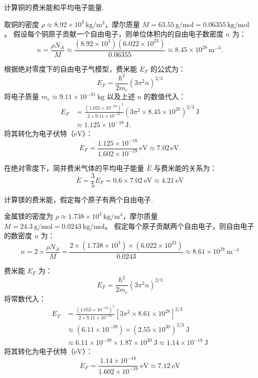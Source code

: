\begin{exercise}\label{ex:27.1}
计算铜的费米能和平均电子能量.
\end{exercise}
\begin{solution}
取铜的密度 $\rho \approx 8.92 \times 10^3\,\mathrm{kg/m^3}$，摩尔质量 $M = 63.55\,\mathrm{g/mol} = 0.06355\,\mathrm{kg/mol}$。
假设每个铜原子贡献一个自由电子，则单位体积内的自由电子数密度 $n$ 为：
$$ n = \frac{\rho N_A}{M} \approx \frac{(8.92 \times 10^3)(6.022 \times 10^{23})}{0.06355} \approx 8.45 \times 10^{28}\,\mathrm{m^{-3}}. $$

根据绝对零度下的自由电子气模型，费米能 $E_F$ 的公式为：
$$ E_F = \frac{\hbar^2}{2m_e} (3\pi^2 n)^{2/3} $$
将电子质量 $m_e \approx 9.11 \times 10^{-31} \ \mathrm{kg}$ 以及上述 $n$ 的数值代入：
\begin{align*}
    E_F &= \frac{(1.055 \times 10^{-34})^2}{2 \times 9.11 \times 10^{-31}}
    \left(3\pi^2 \times 8.45 \times 10^{28}\right)^{2/3}\,\mathrm J \\
        &\approx 1.125 \times 10^{-18}\,\mathrm J.
\end{align*}
将其转化为电子伏特（$\mathrm{eV}$）：
$$ E_F = \frac{1.125 \times 10^{-18}}{1.602 \times 10^{-19}}\,\mathrm{eV} \approx 7.02\,\mathrm{eV}. $$

在绝对零度下，简并费米气体的平均电子能量 $\bar{E}$ 与费米能的关系为：
$$ \bar{E} = \frac{3}{5} E_F = 0.6 \times 7.02 \ \mathrm{eV} \approx 4.21 \ \mathrm{eV} $$
\end{solution}

\begin{exercise}\label{ex:27.2}
计算镁的费米能，假定每个原子有两个自由电子.
\end{exercise}
\begin{solution}
金属镁的密度为 $\rho \approx 1.738 \times 10^3 \ \mathrm{kg/m^3}$，摩尔质量 $M = 24.3 \ \mathrm{g/mol} = 0.0243 \ \mathrm{kg/mol}$。
假定每个原子贡献两个自由电子，则自由电子的数密度 $n$ 为：
$$ n = 2 \times \frac{\rho N_A}{M} = \frac{2 \times (1.738 \times 10^3) \times (6.022 \times 10^{23})}{0.0243} \approx 8.61 \times 10^{28} \ \mathrm{m^{-3}} $$

费米能 $E_F$ 为：
$$ E_F = \frac{\hbar^2}{2m_e} (3\pi^2 n)^{2/3} $$
将常数代入：
\begin{align*}
    E_F &= \frac{(1.055 \times 10^{-34})^2}{2 \times 9.11 \times 10^{-31}} \left[ 3\pi^2 \times 8.61 \times 10^{28} \right]^{2/3} \\
        &\approx (6.11 \times 10^{-39}) \times (2.55 \times 10^{30})^{2/3} \ \mathrm{J} \\
        &\approx 6.11 \times 10^{-39} \times 1.87 \times 10^{20} \ \mathrm{J} \approx 1.14 \times 10^{-18} \ \mathrm{J}
\end{align*}
将其转化为电子伏特（$\mathrm{eV}$）：
$$ E_F = \frac{1.14 \times 10^{-18}}{1.602 \times 10^{-19}} \ \mathrm{eV} \approx 7.12 \ \mathrm{eV} $$
\end{solution}

